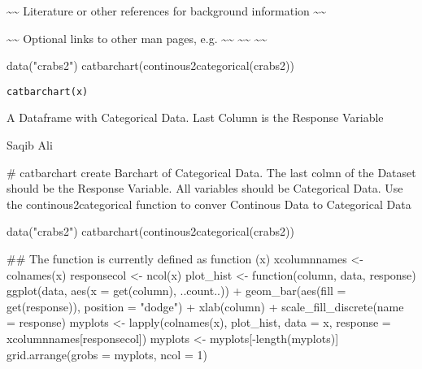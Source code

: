 \documentclass[letterpaper]{book}
\begin{document}
%
\begin{References}\relax
\textasciitilde{}\textasciitilde{} Literature or other references for background information \textasciitilde{}\textasciitilde{}
\end{References}
%
\begin{SeeAlso}\relax
\textasciitilde{}\textasciitilde{} Optional links to other man pages, e.g. \textasciitilde{}\textasciitilde{}
\textasciitilde{}\textasciitilde{}  \textasciitilde{}\textasciitilde{}
\end{SeeAlso}
%
\begin{Examples}
\begin{ExampleCode}

data("crabs2")
catbarchart(continous2categorical(crabs2))

\end{ExampleCode}
\end{Examples}
%
\begin{Usage}
\begin{verbatim}
catbarchart(x)
\end{verbatim}
\end{Usage}
%
\begin{Arguments}
\begin{ldescription}
\item[\code{x}] A Dataframe with Categorical Data. Last Column is the Response Variable
\end{ldescription}
\end{Arguments}
%
\begin{Author}\relax
Saqib Ali
\end{Author}
%
\begin{Examples}
\begin{ExampleCode}


# catbarchart create Barchart of Categorical Data. The last colmn of the Dataset should be the Response Variable. All variables should be Categorical Data. Use the continous2categorical function to conver Continous Data to Categorical Data

data("crabs2")
catbarchart(continous2categorical(crabs2))



## The function is currently defined as
function (x) 
{
    xcolumnnames <- colnames(x)
    responsecol <- ncol(x)
    plot_hist <- function(column, data, response) ggplot(data, 
        aes(x = get(column), ..count..)) + geom_bar(aes(fill = get(response)), 
        position = "dodge") + xlab(column) + scale_fill_discrete(name = response)
    myplots <- lapply(colnames(x), plot_hist, data = x, response = xcolumnnames[responsecol])
    myplots <- myplots[-length(myplots)]
    grid.arrange(grobs = myplots, ncol = 1)
  }
\end{ExampleCode}
\end{Examples}
\end{document}
